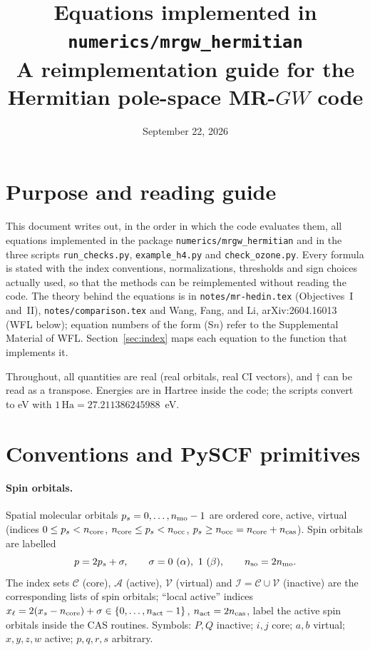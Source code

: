 \documentclass[11pt,a4paper]{article}
\title{Equations implemented in \texttt{numerics/mrgw\_hermitian}\\[2mm]
\large A reimplementation guide for the Hermitian pole-space MR-$GW$ code}
\author{}
\date{September 22, 2026}
\newcommand{\code}[1]{\texttt{#1}}
\newcommand{\so}{\mathrm{so}}
\newcommand{\act}{\mathrm{act}}
\begin{document}
\maketitle

\section*{Purpose and reading guide}

This document writes out, in the order in which the code evaluates them, all
equations implemented in the package \code{numerics/mrgw\_hermitian} and in
the three scripts \code{run\_checks.py}, \code{example\_h4.py} and
\code{check\_ozone.py}.  Every formula is stated with the index conventions,
normalizations, thresholds and sign choices actually used, so that the
methods can be reimplemented without reading the code.  The theory behind the
equations is in \code{notes/mr-hedin.tex} (Objectives~I and~II),
\code{notes/comparison.tex} and Wang, Fang, and Li, arXiv:2604.16013 (WFL
below); equation numbers of the form (S$n$) refer to the Supplemental
Material of WFL.  Section~\ref{sec:index} maps each equation to the function
that implements it.

Throughout, all quantities are real (real orbitals, real CI vectors), and
$\dagger$ can be read as a transpose.  Energies are in Hartree inside the
code; the scripts convert to eV with $1\,\mathrm{Ha}=27.211386245988$~eV.

\section{Conventions and PySCF primitives}
\label{sec:conv}

\paragraph{Spin orbitals.}
Spatial molecular orbitals $p_s=0,\ldots,n_{\rm mo}-1$ are ordered core,
active, virtual (indices $0\le p_s<n_{\rm core}$, $n_{\rm core}\le p_s<n_{\rm occ}$,
$p_s\ge n_{\rm occ}=n_{\rm core}+n_{\rm cas}$).  Spin orbitals are labelled
\begin{equation}
  p=2p_s+\sigma,\qquad \sigma=0\ (\alpha),\ 1\ (\beta),\qquad n_{\so}=2n_{\rm mo}.
  \label{eq:so}
\end{equation}
The index sets $\mathcal C$ (core), $\mathcal A$ (active), $\mathcal V$
(virtual) and $\mathcal I=\mathcal C\cup\mathcal V$ (inactive) are the
corresponding lists of spin orbitals; ``local active'' indices
$x_\ell=2(x_s-n_{\rm core})+\sigma\in\{0,\ldots,n_{\act}-1\}$,
$n_{\act}=2n_{\rm cas}$, label the active spin orbitals inside the CAS
routines.  Symbols: $P,Q$ inactive; $i,j$ core; $a,b$ virtual; $x,y,z,w$
active; $p,q,r,s$ arbitrary.
\end{document}
